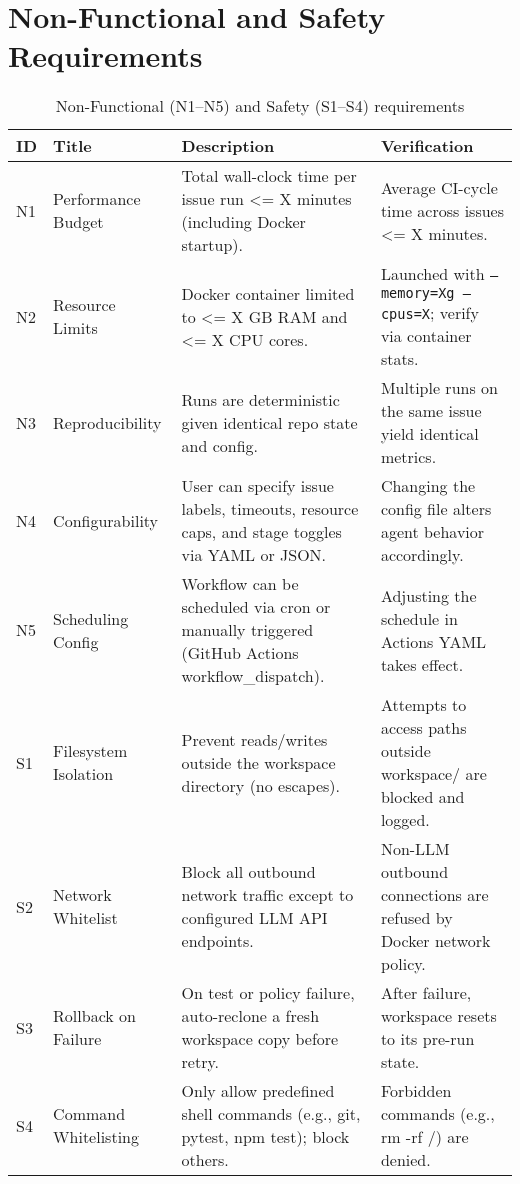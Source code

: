 \section{Non-Functional and Safety Requirements}

\begin{table}[ht]
    \centering
    \small
    \begin{tabular*}{\textwidth}{@{\extracolsep{\fill}} p{1cm} p{3cm} p{5cm} p{4cm} @{}}
        \toprule
        \textbf{ID} & \textbf{Title} & \textbf{Description} & \textbf{Verification} \\
        \midrule
        N1 & Performance Budget
        & Total wall-clock time per issue run <= X minutes (including Docker startup).
        & Average CI-cycle time across issues <= X minutes. \\[4pt]
        N2 & Resource Limits
        & Docker container limited to <= X GB RAM and <= X CPU cores.
        & Launched with \texttt{--memory=Xg --cpus=X}; verify via container stats. \\[4pt]
        N3 & Reproducibility
        & Runs are deterministic given identical repo state and config.
        & Multiple runs on the same issue yield identical metrics. \\[4pt]
        N4 & Configurability
        & User can specify issue labels, timeouts, resource caps, and stage toggles via YAML or JSON.
        & Changing the config file alters agent behavior accordingly. \\[4pt]
        N5 & Scheduling Config
        & Workflow can be scheduled via cron or manually triggered (GitHub Actions workflow\_dispatch).
        & Adjusting the schedule in Actions YAML takes effect. \\[4pt]
        \midrule
        S1 & Filesystem Isolation
        & Prevent reads/writes outside the workspace directory (no escapes).
        & Attempts to access paths outside workspace/ are blocked and logged. \\[4pt]
        S2 & Network Whitelist
        & Block all outbound network traffic except to configured LLM API endpoints.
        & Non-LLM outbound connections are refused by Docker network policy. \\[4pt]
        S3 & Rollback on Failure
        & On test or policy failure, auto-reclone a fresh workspace copy before retry.
        & After failure, workspace resets to its pre-run state. \\[4pt]
        S4 & Command Whitelisting
        & Only allow predefined shell commands (e.g., git, pytest, npm test); block others.
        & Forbidden commands (e.g., rm -rf /) are denied. \\
        \bottomrule
    \end{tabular*}
    \caption{Non-Functional (N1--N5) and Safety (S1--S4) requirements}
\end{table}

